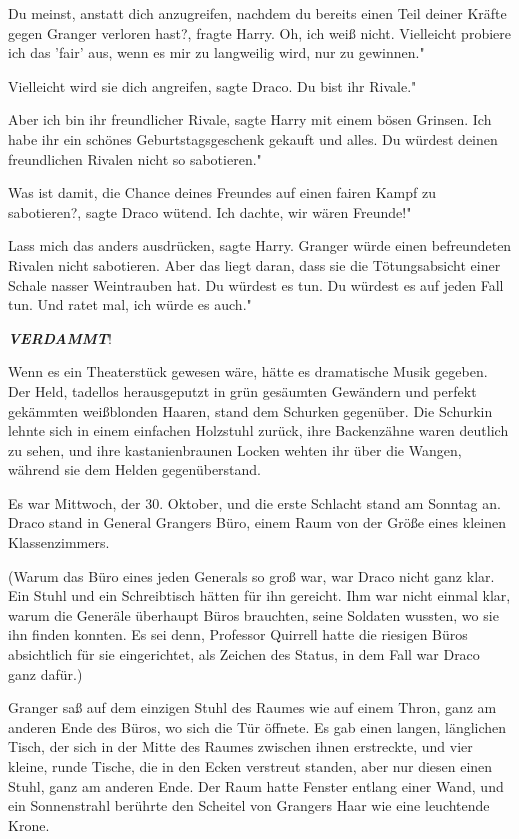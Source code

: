 \glqq Du meinst, anstatt dich anzugreifen, nachdem du bereits einen Teil deiner
Kräfte gegen Granger verloren hast?\grqq{}, fragte Harry. \glqq Oh, ich weiß
nicht. Vielleicht probiere ich das 'fair' aus, wenn es mir zu langweilig wird,
nur zu gewinnen."

\glqq Vielleicht wird sie dich angreifen\grqq{}, sagte Draco. \glqq Du bist ihr
Rivale."

\glqq Aber ich bin ihr freundlicher Rivale\grqq{}, sagte Harry mit einem bösen
Grinsen. \glqq Ich habe ihr ein schönes Geburtstagsgeschenk gekauft und alles.
Du würdest deinen freundlichen Rivalen nicht so sabotieren."

\glqq Was ist damit, die Chance deines Freundes auf einen fairen Kampf zu
sabotieren?\grqq{}, sagte Draco wütend. \glqq Ich dachte, wir wären Freunde!"

\glqq Lass mich das anders ausdrücken\grqq{}, sagte Harry. \glqq Granger würde
einen befreundeten Rivalen nicht sabotieren. Aber das liegt daran, dass sie die
Tötungsabsicht einer Schale nasser Weintrauben hat. Du würdest es tun. Du
würdest es auf jeden Fall tun. Und ratet mal, ich würde es auch."

\textbf{\emph{VERDAMMT}}!

Wenn es ein Theaterstück gewesen wäre, hätte es dramatische Musik gegeben. Der
Held, tadellos herausgeputzt in grün gesäumten Gewändern und perfekt gekämmten
weißblonden Haaren, stand dem Schurken gegenüber. Die Schurkin lehnte sich in
einem einfachen Holzstuhl zurück, ihre Backenzähne waren deutlich zu sehen, und
ihre kastanienbraunen Locken wehten ihr über die Wangen, während sie dem Helden
gegenüberstand.

Es war Mittwoch, der 30. Oktober, und die erste Schlacht stand am Sonntag an.
Draco stand in General Grangers Büro, einem Raum von der Größe eines kleinen
Klassenzimmers.

(Warum das Büro eines jeden Generals so groß war, war Draco nicht ganz klar. Ein
Stuhl und ein Schreibtisch hätten für ihn gereicht. Ihm war nicht einmal klar,
warum die Generäle überhaupt Büros brauchten, seine Soldaten wussten, wo sie ihn
finden konnten. Es sei denn, Professor Quirrell hatte die riesigen Büros
absichtlich für sie eingerichtet, als Zeichen des Status, in dem Fall war Draco
ganz dafür.)

Granger saß auf dem einzigen Stuhl des Raumes wie auf einem Thron, ganz am
anderen Ende des Büros, wo sich die Tür öffnete. Es gab einen langen, länglichen
Tisch, der sich in der Mitte des Raumes zwischen ihnen erstreckte, und vier
kleine, runde Tische, die in den Ecken verstreut standen, aber nur diesen einen
Stuhl, ganz am anderen Ende. Der Raum hatte Fenster entlang einer Wand, und ein
Sonnenstrahl berührte den Scheitel von Grangers Haar wie eine leuchtende Krone.

